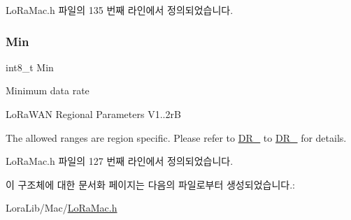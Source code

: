Lo\+Ra\+Mac.\+h 파일의 135 번째 라인에서 정의되었습니다.

\mbox{\label{structu_dr_range_1_1s_fields_ad870086364c5eb410eec40e1025e3203}} 
\subsubsection{\texorpdfstring{Min}{Min}}
{\footnotesize\ttfamily int8\+\_\+t Min}

Minimum data rate

Lo\+Ra\+W\+AN Regional Parameters V1..\+2rB

The allowed ranges are region specific. Please refer to \mbox{\hyperlink{group___r_e_g_i_o_n_ga6c4ef966b4f3d5eb7597b087f2b97095}{D\+R\+\_}} to \mbox{\hyperlink{group___r_e_g_i_o_n_gac6e078f51b71f05093daf27834997396}{D\+R\+\_}} for details. 

Lo\+Ra\+Mac.\+h 파일의 127 번째 라인에서 정의되었습니다.



이 구조체에 대한 문서화 페이지는 다음의 파일로부터 생성되었습니다.\+:\begin{DoxyCompactItemize}
\item 
Lora\+Lib/\+Mac/\mbox{\hyperlink{_lo_ra_mac_8h}{Lo\+Ra\+Mac.\+h}}\end{DoxyCompactItemize}
